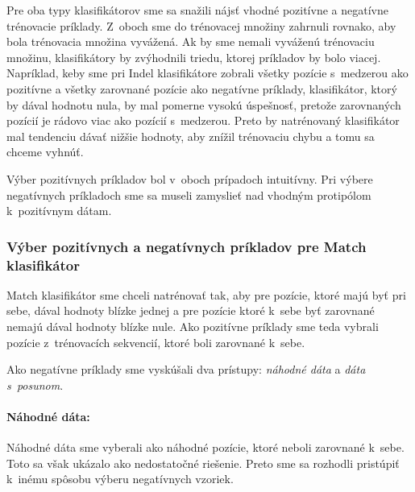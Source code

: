 Pre oba typy klasifikátorov sme sa snažili nájsť vhodné pozitívne a negatívne trénovacie príklady. Z~oboch sme do trénovacej množiny zahrnuli rovnako, aby bola trénovacia množina vyvážená. Ak by sme nemali vyváženú trénovaciu množinu, klasifikátory by zvýhodnili triedu, ktorej príkladov by bolo viacej. Napríklad, keby sme pri Indel klasifikátore zobrali všetky pozície s~medzerou ako pozitívne a všetky zarovnané pozície ako negatívne príklady, klasifikátor, ktorý by dával hodnotu nula, by mal pomerne vysokú úspešnosť, pretože zarovnaných pozícií je rádovo viac ako pozícií s~medzerou. Preto by natrénovaný klasifikátor mal tendenciu dávať nižšie hodnoty, aby znížil trénovaciu chybu a tomu sa chceme vyhnúť.

Výber pozitívnych príkladov bol v~oboch prípadoch intuitívny. Pri výbere negatívnych príkladoch sme sa museli zamyslieť nad vhodným protipólom k~pozitívnym dátam.

\subsubsection{Výber pozitívnych a negatívnych príkladov pre Match klasifikátor}

Match klasifikátor sme chceli natrénovať tak, aby pre pozície, ktoré majú byť pri sebe, dával hodnoty blízke jednej a pre pozície ktoré k~sebe byť zarovnané nemajú dával hodnoty blízke nule.
Ako pozitívne príklady sme teda vybrali pozície z~trénovacích sekvencií, ktoré boli zarovnané k~sebe.

Ako negatívne príklady sme vyskúšali dva prístupy: \textit{náhodné dáta} a \textit{dáta s~posunom}.

\paragraph{Náhodné dáta:} Náhodné dáta sme vyberali ako náhodné pozície, ktoré neboli zarovnané k~sebe. Toto sa však ukázalo ako nedostatočné riešenie.
Preto sme sa rozhodli pristúpiť k~inému spôsobu výberu negatívnych vzoriek.


